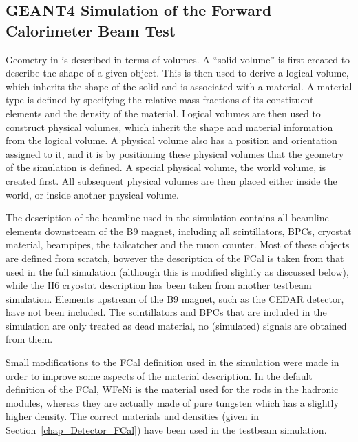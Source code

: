 \subsection{GEANT4 Simulation of the Forward Calorimeter Beam Test}
\label{TB_overview_g4}
Geometry in \geant is described in terms of volumes. A ``solid volume'' is first created to describe the shape of a given object. This is then used to derive a logical volume, which inherits the shape of the solid and is associated with a material. A material type is defined by specifying the relative mass fractions  of its constituent elements and the density of the material. Logical volumes are then used to construct physical volumes, which inherit the shape and material information from the logical volume. A physical volume also has a position and orientation assigned to it, and it is by positioning these physical volumes that the geometry of the simulation is defined. A special physical volume, the world volume, is created first. All subsequent physical volumes are then placed either inside the world, or inside another physical volume. 

The description of the beamline used in the simulation contains all beamline elements downstream of the B9 magnet, including all scintillators, BPCs, cryostat material, beampipes, the tailcatcher and the muon counter. Most of these objects are defined from scratch, however the description of the FCal is taken from that used in the full \atlas simulation (although this is modified slightly as discussed below), while the H6 cryostat description has been taken from another testbeam simulation. Elements upstream of the B9 magnet, such as the CEDAR detector, have not been included. The scintillators and BPCs that are included in the simulation are only treated as dead material, no (simulated) signals are obtained from them.

Small modifications to the FCal definition used in the simulation were made in order to improve some aspects of the material description. In the default definition of the FCal, WFeNi is the material used for the rods in the hadronic modules, whereas they are actually made of pure tungsten which has a slightly higher density. 
The correct materials and densities (given in Section~\ref{chap_Detector_FCal}) have been used in the testbeam simulation.

